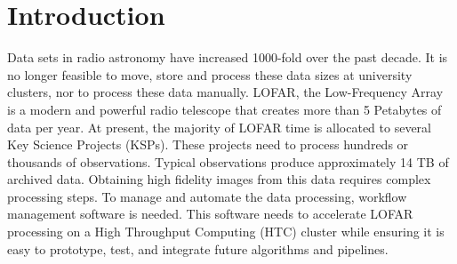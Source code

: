 %
%
%
%
\section{Introduction}\label{sec:ch5_intro}

Data sets in radio astronomy have increased 1000-fold over the past decade\cite{sabater_datasize}. It is no longer feasible to move, store and process these data sizes at university clusters, nor to process these data manually. LOFAR, the Low-Frequency Array\cite{LOFAR} is a modern and powerful radio telescope that creates more than 5 Petabytes of data per year. At present, the majority of LOFAR time is allocated to several Key Science Projects (KSPs)\cite{lotss}. These projects need to process hundreds or thousands of observations. Typical observations produce approximately 14 TB of archived data. Obtaining high fidelity images from this data requires complex processing steps. To manage and automate the data processing, workflow management software is needed. This software needs to accelerate LOFAR processing on a High Throughput Computing (HTC) cluster while ensuring it is easy to prototype, test, and integrate future algorithms and pipelines. 
	
